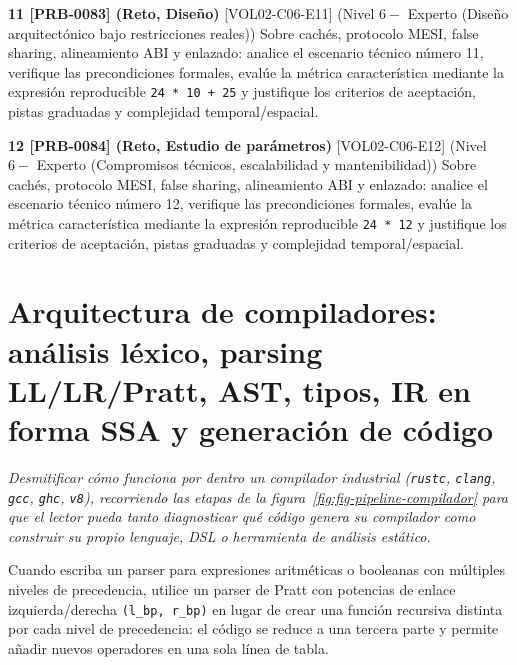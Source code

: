 \documentclass{book}
\begin{document}
\begin{tcolorbox}[title={Ejercicios}, studiumworked, breakable]
\noindent\textbf{11 [PRB-0083] (Reto, Diseño)}
[VOL02-C06-E11] (Nivel \(6 -\) Experto (Diseño arquitectónico bajo restricciones reales)) Sobre cachés, protocolo MESI, false sharing, alineamiento ABI y enlazado: analice el escenario técnico número 11, verifique las precondiciones formales, evalúe la métrica característica mediante la expresión reproducible \texttt{24 * 10 + 25} y justifique los criterios de aceptación, pistas graduadas y complejidad temporal/espacial.

\noindent\textbf{12 [PRB-0084] (Reto, Estudio de parámetros)}
[VOL02-C06-E12] (Nivel \(6 -\) Experto (Compromisos técnicos, escalabilidad y mantenibilidad)) Sobre cachés, protocolo MESI, false sharing, alineamiento ABI y enlazado: analice el escenario técnico número 12, verifique las precondiciones formales, evalúe la métrica característica mediante la expresión reproducible \texttt{24 * 12} y justifique los criterios de aceptación, pistas graduadas y complejidad temporal/espacial.
\end{tcolorbox}

\chapter{Arquitectura de compiladores: análisis léxico, parsing LL/LR/Pratt, AST, tipos, IR en forma SSA y generación de código}
\label{chap:cap07-compiladores-lexing-parsing-ssa-codegen}

\noindent\textit{Desmitificar cómo funciona por dentro un compilador industrial (\texttt{rustc}, \texttt{clang}, \texttt{gcc}, \texttt{ghc}, \texttt{v8}), recorriendo las etapas de la figura~\ref{fig:fig-pipeline-compilador} para que el lector pueda tanto diagnosticar qué código genera su compilador como construir su propio lenguaje, DSL o herramienta de análisis estático.}

\begin{tcolorbox}[title={Consejo}, studiumtip, breakable]

Cuando escriba un parser para expresiones aritméticas o booleanas con múltiples niveles de precedencia, utilice un parser de Pratt con potencias de enlace izquierda/derecha \texttt{(l\_bp, r\_bp)} en lugar de crear una función recursiva distinta por cada nivel de precedencia: el código se reduce a una tercera parte y permite añadir nuevos operadores en una sola línea de tabla.
\end{tcolorbox}
\end{document}
